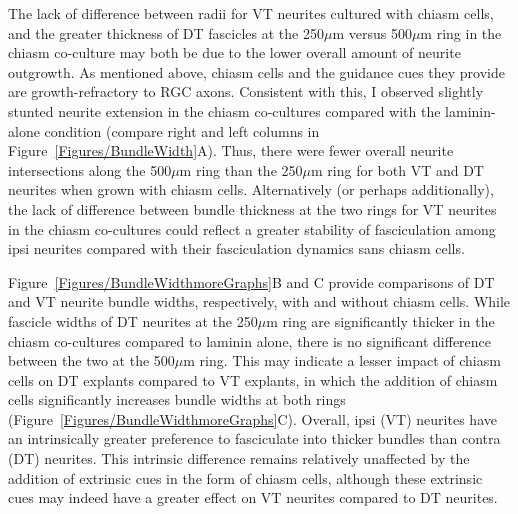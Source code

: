 The lack of difference between radii for VT neurites cultured with chiasm cells, and the greater thickness of DT fascicles at the 250$\mu$m versus 500$\mu$m ring in the chiasm co-culture may both be due to the lower overall amount of neurite outgrowth.
As mentioned above, chiasm cells and the guidance cues they provide are growth-refractory to RGC axons.
Consistent with this, I observed slightly stunted neurite extension in the chiasm co-cultures compared with the laminin-alone condition (compare right and left columns in Figure~\ref{Figures/BundleWidth}A).
Thus, there were fewer overall neurite intersections along the 500$\mu$m ring than the 250$\mu$m ring for both VT and DT neurites when grown with chiasm cells.
Alternatively (or perhaps additionally), the lack of difference between bundle thickness at the two rings for VT neurites in the chiasm co-cultures could reflect a greater stability of fasciculation among ipsi neurites compared with their fasciculation dynamics sans chiasm cells.

Figure~\ref{Figures/BundleWidthmoreGraphs}B and C provide comparisons of DT and VT neurite bundle widths, respectively, with and without chiasm cells.
While fascicle widths of DT neurites at the 250$\mu$m ring are significantly thicker in the chiasm co-cultures compared to laminin alone, there is no significant difference between the two at the 500$\mu$m ring.
This may indicate a lesser impact of chiasm cells on DT explants compared to VT explants, in which the addition of chiasm cells significantly increases bundle widths at both rings (Figure~\ref{Figures/BundleWidthmoreGraphs}C).
Overall, ipsi (VT) neurites have an intrinsically greater preference to fasciculate into thicker bundles than contra (DT) neurites.
This intrinsic difference remains relatively unaffected by the addition of extrinsic cues in the form of chiasm cells, although these extrinsic cues may indeed have a greater effect on VT neurites compared to DT neurites.